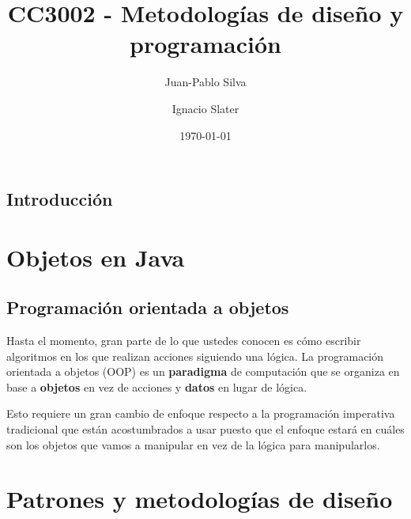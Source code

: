 \documentclass[12pt]{book}
\title{CC3002 - Metodologías de diseño y programación}
\author{Juan-Pablo Silva}
\author{Ignacio Slater}
\affil{Departamento de Ciencias de la Computación, Universidad de Chile}
\date{\today}
\begin{document}
  \frontmatter
  \maketitle
  \tableofcontents
  \chapter{Introducción}

  \mainmatter
  \part{Objetos en Java}
    \chapter{Programación orientada a objetos}
      Hasta el momento, gran parte de lo que ustedes conocen es cómo escribir algoritmos 
      en los que realizan acciones siguiendo una lógica.
      La programación orientada a objetos (OOP) es un \textbf{paradigma} de computación 
      que se organiza en base a \textbf{objetos} en vez de acciones y \textbf{datos} en 
      lugar de lógica.

      Esto requiere un gran cambio de enfoque respecto a la programación imperativa 
      tradicional que están acostumbrados a usar puesto que el enfoque estará en cuáles 
      son los objetos que vamos a manipular en vez de la lógica para manipularlos.
  \part{Patrones y metodologías de diseño}
\end{document}
